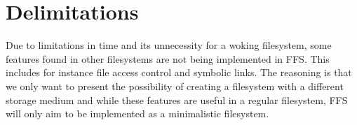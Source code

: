 \section{Delimitations} %

Due to limitations in time and its unnecessity for a woking filesystem, some features found in other filesystems are not being implemented in FFS. This includes for instance file access control and symbolic links. The reasoning is that we only want to present the possibility of creating a filesystem with a different storage medium and while these features are useful in a regular filesystem, FFS will only aim to be implemented as a minimalistic filesystem. 